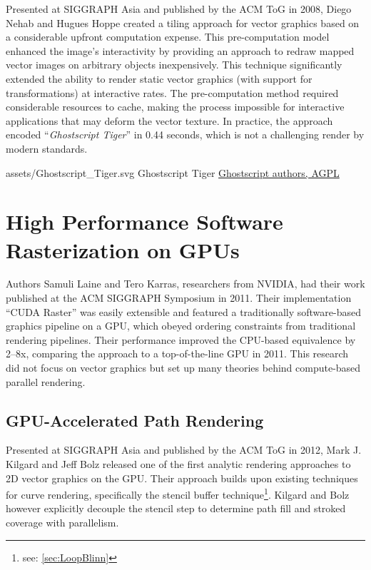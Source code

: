 Presented at SIGGRAPH Asia and published by the ACM ToG in 2008, Diego Nehab and Hugues Hoppe created a tiling approach for vector graphics based on a considerable upfront computation expense. This pre-computation model enhanced the image's interactivity by providing an approach to redraw mapped vector images on arbitrary objects inexpensively. This technique significantly extended the ability to render static vector graphics (with support for transformations) at interactive rates. The pre-computation method required considerable resources to cache, making the process impossible for interactive applications that may deform the vector texture. In practice, the approach encoded ``\textit{Ghostscript Tiger}'' in 0.44 seconds\cite{Nehab08}, which is not a challenging render by modern standards.\medskip

\smallsvg
{assets/Ghostscript_Tiger.svg}
{Ghostscript Tiger}
{\href{http://www.gnu.org/licenses/agpl.html}{Ghostscript authors, AGPL}}\medskip

\section{High Performance Software Rasterization on GPUs}\cite{Laine11}
Authors Samuli Laine and Tero Karras, researchers from NVIDIA, had their work published at the ACM SIGGRAPH Symposium in 2011. Their implementation ``CUDA Raster'' was easily extensible and featured a traditionally software-based graphics pipeline on a GPU, which obeyed ordering constraints from traditional rendering pipelines. Their performance improved the CPU-based equivalence by 2–8x, comparing the approach to a top-of-the-line GPU in 2011. This research did not focus on vector graphics but set up many theories behind compute-based parallel rendering.

\subsection{GPU-Accelerated Path Rendering}\cite{Kilgard12}
Presented at SIGGRAPH Asia and published by the ACM ToG in 2012, Mark J. Kilgard and Jeff Bolz released one of the first analytic rendering approaches to 2D vector graphics on the GPU. Their approach builds upon existing techniques for curve rendering, specifically the stencil buffer technique\footnote{see: \cref{sec:LoopBlinn}}. Kilgard and Bolz however explicitly decouple the stencil step to determine path fill and stroked coverage with parallelism.

